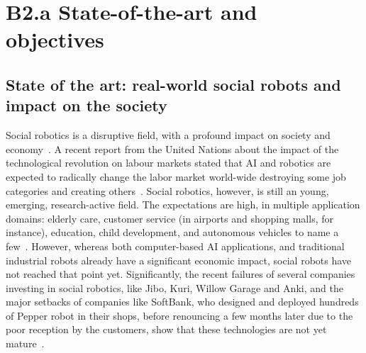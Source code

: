 
\newpage
\chapter{B2.a State-of-the-art and objectives}






\section{State of the art: real-world social robots and impact on the
society}

Social robotics is a disruptive field, with a profound impact on society and
economy~\cite{williams2020social}. A recent report from the United Nations about
the impact of the technological revolution on labour markets stated that AI and
robotics are expected to radically change the labor market world-wide destroying
some job categories and creating others~\cite{bruckner2017frontier}. Social
robotics, however, is still an young, emerging, research-active field. The
expectations are high, in multiple application domains: elderly care, customer
service (in airports and shopping malls, for instance), education, child
development, and autonomous vehicles to name a few~\cite{baillie2019challenges}.
However, whereas both computer-based AI applications, and traditional industrial
robots already have a significant economic impact, social robots have not
reached that point yet. Significantly, the recent failures of several companies
investing in social robotics, like Jibo, Kuri, Willow Garage and Anki, and the
major setbacks of companies like SoftBank, who designed and deployed hundreds of
Pepper robot in their shops, before renouncing a few months later due to the poor
reception by the customers, show that these technologies are not yet
mature~\cite{tulli2019great}.

